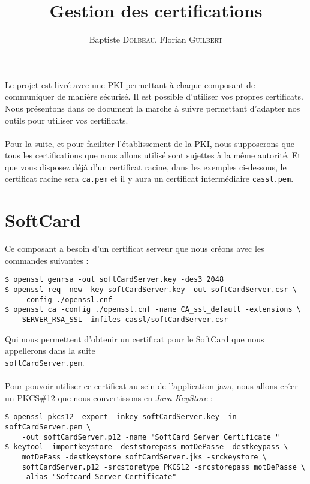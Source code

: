 \documentclass[a4paper,10pt]{article}
\title{Gestion des certifications}
\author{Baptiste \textsc{Dolbeau}, Florian \textsc{Guilbert}}
\begin{document}
\maketitle
\tableofcontents

\clearpage

Le projet est livré avec une PKI permettant à chaque composant de communiquer
de manière sécurisé. Il est possible d'utiliser vos propres certificats. 
Nous présentons dans ce document la marche à suivre permettant d'adapter 
nos outils pour utiliser vos certificats.

\paragraph{}
Pour la suite, et pour faciliter l'établissement de la PKI, nous supposerons
que tous les certifications que nous allons utilisé sont sujettes à la 
même autorité. Et que vous disposez déjà d'un certificat racine, dans 
les exemples ci-dessous, le certificat racine sera \texttt{ca.pem} et 
il y aura un certificat intermédiaire \texttt{cassl.pem}.

\section{SoftCard}
Ce composant a besoin d'un certificat serveur que nous créons avec les 
commandes suivantes : 
\begin{verbatim}
$ openssl genrsa -out softCardServer.key -des3 2048
$ openssl req -new -key softCardServer.key -out softCardServer.csr \
    -config ./openssl.cnf
$ openssl ca -config ./openssl.cnf -name CA_ssl_default -extensions \
    SERVER_RSA_SSL -infiles cassl/softCardServer.csr
\end{verbatim}
Qui nous permettent d'obtenir un certificat pour le SoftCard que nous 
appellerons dans la suite \\ \texttt{softCardServer.pem}.

\paragraph{}
Pour pouvoir utiliser ce certificat au sein de l'application java, nous allons
créer un PKCS\#12 que nous convertissons en \emph{Java KeyStore} : 
\begin{verbatim}
$ openssl pkcs12 -export -inkey softCardServer.key -in softCardServer.pem \ 
    -out softCardServer.p12 -name "SoftCard Server Certificate "
$ keytool -importkeystore -deststorepass motDePasse -destkeypass \ 
    motDePass -destkeystore softCardServer.jks -srckeystore \ 
    softCardServer.p12 -srcstoretype PKCS12 -srcstorepass motDePasse \ 
    -alias "Softcard Server Certificate"
\end{verbatim}
\end{document}
